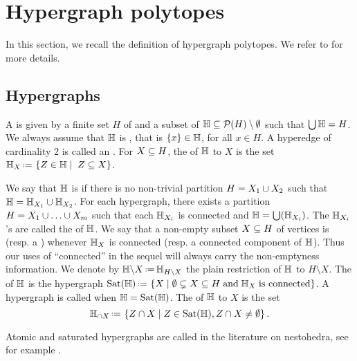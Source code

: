 
\section{Hypergraph polytopes} 
\label{s:hypergraph}

In this section, we recall the definition of hypergraph polytopes. 
We refer to \cite{DP-HP,COI} for more details. 


\subsection{Hypergraphs}
A  is given by a finite set $H$ of  and a subset of  ${\mathbb H}\subseteq {\cal P}(H)\setminus\emptyset$ such that $\bigcup {\mathbb H}=H$. 
We always assume that ${\mathbb H}$ is , that is $\left\{x\right\}\in {\mathbb H}$, for all $x\in H$. 
A hyperedge of cardinality 2 is called an .  
For $X\subseteq H$, the  of ${\mathbb H}$ to $X$ is the set 
$\hyper{H}_X \eqdef   \setc{Z\in \hyper{H}}{\; Z\inc X}$.

We say that ${\mathbb H}$ is  if there is no non-trivial partition $H=X_1\cup X_2$ such that ${\mathbb H}={\mathbb H}_{X_1}\cup {\mathbb H}_{X_2}$. 
For each hypergraph, there exists a partition $H=X_1\cup\ldots\cup X_m$ such that each ${\mathbb H}_{X_i}$ is connected and ${\mathbb H}=\bigcup({\mathbb H}_{X_i})$.  
The ${\mathbb H}_{X_i}$'s are called the  of ${\mathbb H}$.
We say that a non-empty subset $X\subseteq H$ of vertices is  (resp. a ) whenever ${\mathbb H}_X$ is connected (resp. a connected component of ${\mathbb H}$).  Thus our uses of ``connected'' in the sequel will always carry the non-emptyness information.
We denote by $\restrH{H}{X}\eqdef  \hyper{H}_{H\setminus X}$ the plain restriction of ${\mathbb H}$ to $H \setminus X$.
The  of ${\mathbb H}$ is the hypergraph
$\Sat(\hyper{H})\eqdef  \setc{X}{\emptyset\incs X\inc H\;\mbox{and}\;\hyper{H}_X\;\mbox{is connected}}$.
A hypergraph is called  when ${\mathbb H}=\operatorname{Sat}({\mathbb H})$.  
The  of ${\mathbb H}$ to $X$ is the set $$\recrestr{\hyper{H}}{X}\eqdef  \setc{Z\cap X}{Z\in \Sat(\hyper{H}), Z\cap X\neq\emptyset}.$$

\begin{rem}
    Atomic and saturated hypergraphs are called  in the  literature on nestohedra, see for example \cite{P09,FS05}.
\end{rem}

